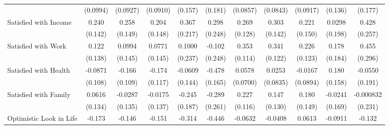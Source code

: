 {\begin{tabular}{l*{10}{c}}
            &    (0.0994)         &    (0.0927)         &    (0.0910)         &     (0.157)         &     (0.181)         &    (0.0857)         &    (0.0843)         &    (0.0917)         &     (0.136)         &     (0.177)         \\
\addlinespace
Satisfied with Income&       0.240         &       0.258         &       0.204         &       0.367         &       0.298         &       0.269\sym{*}  &       0.303\sym{*}  &       0.221         &      0.0298         &       0.428         \\
            &     (0.142)         &     (0.149)         &     (0.148)         &     (0.217)         &     (0.248)         &     (0.128)         &     (0.142)         &     (0.150)         &     (0.198)         &     (0.257)         \\
\addlinespace
Satisfied with Work&       0.122         &      0.0994         &      0.0771         &      0.1000         &      -0.102         &       0.353\sym{**} &       0.341\sym{**} &       0.226         &       0.178         &       0.455         \\
            &     (0.138)         &     (0.145)         &     (0.145)         &     (0.237)         &     (0.248)         &     (0.114)         &     (0.122)         &     (0.123)         &     (0.184)         &     (0.296)         \\
\addlinespace
Satisfied with Health&     -0.0871         &      -0.166         &      -0.174         &     -0.0609         &      -0.478\sym{**} &      0.0578         &      0.0253         &     -0.0167         &       0.180         &     -0.0550         \\
            &     (0.108)         &     (0.109)         &     (0.117)         &     (0.144)         &     (0.165)         &    (0.0700)         &    (0.0835)         &    (0.0894)         &     (0.158)         &     (0.191)         \\
\addlinespace
Satisfied with Family&      0.0616         &     -0.0287         &     -0.0175         &      -0.245         &      -0.289         &       0.227\sym{*}  &       0.147         &       0.180         &     -0.0241         &   -0.000832         \\
            &     (0.134)         &     (0.135)         &     (0.137)         &     (0.187)         &     (0.261)         &     (0.116)         &     (0.130)         &     (0.149)         &     (0.169)         &     (0.231)         \\
\addlinespace
Optimistic Look in Life&      -0.173\sym{*}  &      -0.146         &      -0.151         &      -0.314\sym{*}  &      -0.446\sym{***}&     -0.0632         &     -0.0408         &      0.0613         &     -0.0911         &      -0.132         \\

\end{tabular}}
